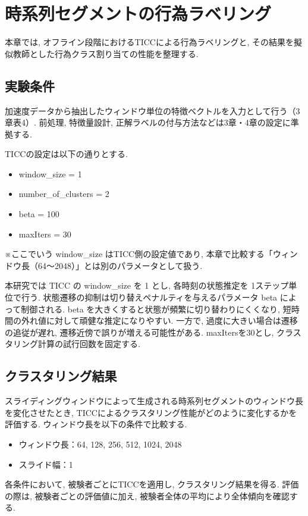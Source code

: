 \documentclass[a4paper,12pt]{jreport}
\begin{document}
\chapter{時系列セグメントの行為ラベリング}
本章では, オフライン段階におけるTICCによる行為ラベリングと, その結果を擬似教師とした行為クラス割り当ての性能を整理する. 

\section{実験条件}
加速度データから抽出したウィンドウ単位の特徴ベクトルを入力として行う（3章表4）. 前処理, 特徴量設計, 正解ラベルの付与方法などは3章・4章の設定に準拠する. 

TICCの設定は以下の通りとする. 
\begin{itemize}
    \item window\_size = 1
    \item number\_of\_clusters = 2
    \item beta = 100
    \item maxIters = 30
\end{itemize}

※ここでいう window\_size はTICC側の設定値であり, 本章で比較する「ウィンドウ長（64〜2048）」とは別のパラメータとして扱う. 

本研究では TICC の window\_size を 1 とし, 各時刻の状態推定を 1ステップ単位で行う. 状態遷移の抑制は切り替えペナルティを与えるパラメータ beta によって制御される. beta を大きくすると状態が頻繁に切り替わりにくくなり, 短時間の外れ値に対して頑健な推定になりやすい. 一方で, 過度に大きい場合は遷移の追従が遅れ, 遷移近傍で誤りが増える可能性がある. maxItersを30とし, クラスタリング計算の試行回数を固定する. 

\section{クラスタリング結果}
スライディングウィンドウによって生成される時系列セグメントのウィンドウ長を変化させたとき, TICCによるクラスタリング性能がどのように変化するかを評価する. ウィンドウ長を以下の条件で比較する. 
\begin{itemize}
    \item ウィンドウ長：64, 128, 256, 512, 1024, 2048
    \item スライド幅：1
\end{itemize}
各条件において, 被験者ごとにTICCを適用し, クラスタリング結果を得る. 評価の際は, 被験者ごとの評価値に加え, 被験者全体の平均により全体傾向を確認する.
\end{document}
